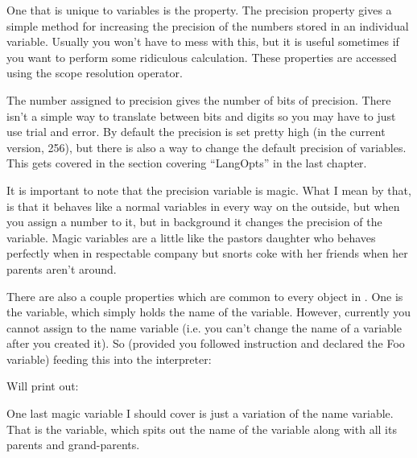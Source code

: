 One that is unique to variables is the  property.  The precision property gives a simple method for increasing the precision of the numbers stored in an individual variable.  Usually you won't have to mess with this, but it is useful sometimes if you want to perform some ridiculous calculation.  These properties are accessed using the scope resolution operator.

\begin{SSCodeBox}
\scitea{;}
\end{SSCodeBox}

The number assigned to precision gives the number of bits of precision.  There isn't a simple way to translate between bits and digits so you may have to just use trial and error.  By default the precision is set pretty high (in the current version, 256), but there is also a way to change the default precision of variables.  This gets covered in the section covering ``LangOpts'' in the last chapter.

It is important to note that the precision variable is magic.  What I mean by that, is that it behaves like a normal variables in every way on the outside, but when you assign a number to it, but in background it changes the precision of the variable.  Magic variables are a little like the pastors daughter who behaves perfectly when in respectable company but snorts coke with her friends when her parents aren't around.

There are also a couple properties which are common to every object in \SSquared{}.  One is the  variable, which simply holds the name of the variable.  However, currently you cannot assign to the name variable (i.e. you can't change the name of a variable after you created it).  So (provided you followed instruction and declared the Foo variable) feeding this into the interpreter:

\begin{SSCodeBox}
\end{SSCodeBox}

\noindent{}Will print out:

\begin{SSCodeBox}
\end{SSCodeBox}

One last magic variable I should cover is just a variation of the name variable.  That is the  variable, which spits out the name of the variable along with all its parents and grand-parents.

